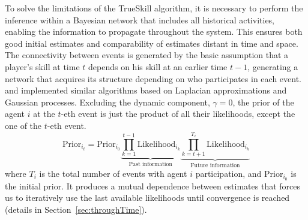 \documentclass[article]{jss}
\begin{document}
To solve the limitations of the TrueSkill algorithm, it is necessary to perform the inference within a Bayesian network that includes all historical activities, enabling the information to propagate throughout the system. 
This ensures both good initial estimates and comparability of estimates distant in time and space. 
The connectivity between events is generated by the basic assumption that a player's skill at time $t$ depends on his skill at an earlier time $t-1$, generating a network that acquires its structure depending on who participates in each event. 
\cite{Coulom2008} and \cite{Maystre2019} implemented similar algorithms based on Laplacian approximations and Gaussian processes. 
Excluding the dynamic component, $\gamma = 0$, the prior of the agent $i$ at the $t$-eth event is just the product of all their likelihoods, except the one of the $t$-eth event. 
%
\begin{equation}\label{eq:smooth_prior}
 \text{Prior}_{i_t} = \text{Prior}_{i_0} \underbrace{\prod_{k = 1}^{t-1} \text{Likelihood}_{i_k}}_{\text{Past information}} \underbrace{\prod_{k = t + 1}^{T_i} \text{Likelihood}_{i_k}}_{\text{Future information}}
\end{equation}
%
where $T_i$ is the total number of events with agent $i$ participation, and {\small Prior$_{i_0}$} is the initial prior. 
It produces a mutual dependence between estimates that forces us to iteratively use the last available likelihoods until convergence is reached (details in Section~\ref{sec:throughTime}). 
%
\end{document}
